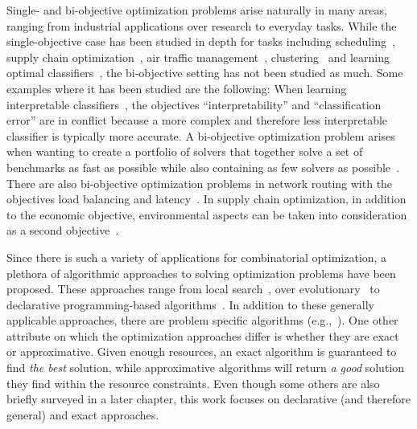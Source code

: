 Single- and bi-objective optimization problems arise naturally in many areas, ranging from industrial applications over research to everyday tasks.
While the single-objective case has been studied in depth for tasks including scheduling~\autocites{DBLP:conf/cp/Stojadinovic14,DBLP:conf/cpaior/BofillGSV15,DBLP:journals/ior/Solomon87,DBLP:journals/candie/AkyolB07}, supply chain optimization~\autocite{DBLP:journals/cce/Papageorgiou09}, air traffic management~\autocites{DBLP:journals/ior/BertsimasLO11,RichardsHow2002Aircrafttrajectoryplanning}, clustering~\autocite{DBLP:journals/ai/DaoDV17,DBLP:conf/sdm/DavidsonRS10} and learning optimal classifiers~\autocites{DBLP:conf/cp/MaliotovM18,DBLP:conf/ijcai/NarodytskaIPM18,DBLP:conf/ijcai/Hu0HH20,DBLP:conf/cp/YuISB20,DBLP:conf/aaai/DemirovicS21,DBLP:conf/cp/ShatiCM21,DBLP:conf/cade/IgnatievPNM18}, the bi-objective setting has not been studied as much.
Some examples where it has been studied are the following:
When learning interpretable classifiers~\autocites{DBLP:conf/ijcai/Ignatiev0NS21,DBLP:conf/cp/MaliotovM18,DBLP:conf/ijcai/NarodytskaIPM18,DBLP:conf/ijcai/Hu0HH20,DBLP:conf/cp/YuISB20,DBLP:conf/aaai/Ignatiev0S021,DBLP:conf/cade/IgnatievPNM18}, the objectives ``interpretability'' and ``classification error'' are in conflict because a more complex and therefore less interpretable classifier is typically more accurate.
A bi-objective optimization problem arises when wanting to create a portfolio of solvers that together solve a set of benchmarks as fast as possible while also containing as few solvers as possible~\autocite{DBLP:conf/cp/JanotaMSM21}.
There are also bi-objective optimization problems in network routing with the objectives load balancing and latency~\autocite{SilverioEtAl2022biobjectiveoptimization}.
In supply chain optimization, in addition to the economic objective, environmental aspects can be taken into consideration as a second objective~\autocites{DBLP:journals/cce/Pinto-VarelaBN11,DBLP:journals/candie/TautenhainBN19}.

Since there is such a variety of applications for combinatorial optimization, a plethora of algorithmic approaches to solving optimization problems have been proposed.
These approaches range from local search~\autocite{DBLP:books/daglib/0017492}, over evolutionary~\autocites{DBLP:books/daglib/0087893,DBLP:journals/jgo/StornP97} to declarative programming-based algorithms~\autocite{handbook2-maxsat,ChenEtAl2010-intro,DBLP:reference/fai/2}.
In addition to these generally applicable approaches, there are problem specific algorithms (e.g.,~\autocite{DBLP:conf/aaai/DemirovicS21,DBLP:conf/kdd/NijssenF07,DBLP:conf/nips/HuRS19}).
One other attribute on which the optimization approaches differ is whether they are exact or approximative.
Given enough resources, an exact algorithm is guaranteed to find \emph{the best} solution, while approximative algorithms will return \emph{a good} solution they find within the resource constraints.
Even though some others are also briefly surveyed in a later chapter, this work focuses on declarative (and therefore general) and exact approaches.

